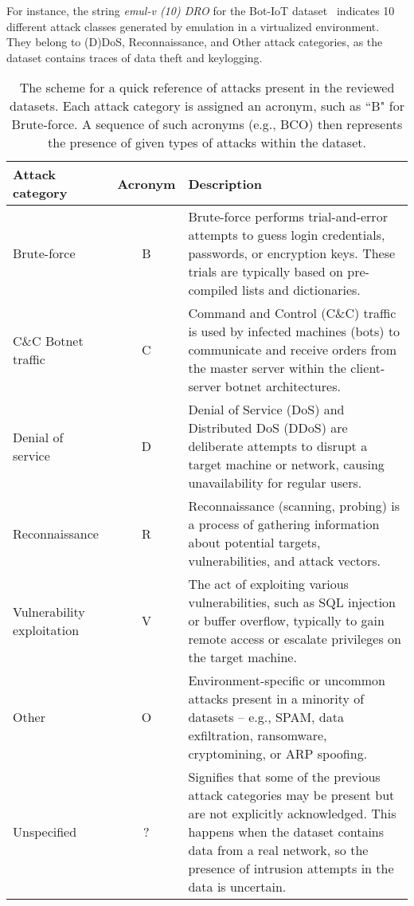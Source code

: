For instance, the string \emph{emul-v (10) DRO} for the Bot-IoT dataset~\cite{koroniotis2019_botiot_dataset} indicates 10 different attack classes generated by emulation in a virtualized environment. They belong to (D)DoS, Reconnaissance, and Other attack categories, as the dataset contains traces of data theft and keylogging.

\begin{table*}[t]
    \centering
    \caption{The scheme for a quick reference of attacks present in the reviewed datasets. Each attack category is assigned an acronym, such as ``B" for Brute-force. A sequence of such acronyms (e.g., BCO) then represents the presence of given types of attacks within the dataset.}
    \vspace*{0.4em}
    \begin{tabular}{p{2.8cm} c p{12.2cm}}
    \textbf{Attack category} & \textbf{Acronym} & \textbf{Description} \\ \toprule
    Brute-force & B & Brute-force performs trial-and-error attempts to guess login credentials, passwords, or encryption keys. These trials are typically based on pre-compiled lists and dictionaries. \\ \midrule
    
    C\&C Botnet traffic & C & Command and Control (C\&C) traffic is used by infected machines (bots) to communicate and receive orders from the master server within the client-server botnet architectures. \\ \midrule

    Denial of service & D & Denial of Service (DoS) and Distributed DoS (DDoS) are deliberate attempts to disrupt a target machine or network, causing unavailability for regular users. \\ \midrule

    Reconnaissance & R & Reconnaissance (scanning, probing) is a process of gathering information about potential targets, vulnerabilities, and attack vectors. \\ \midrule

    Vulnerability \mbox{exploitation} & V & The act of exploiting various vulnerabilities, such as SQL injection or buffer overflow, typically to gain remote access or escalate privileges on the target machine. \\ \midrule

    Other & O & Environment-specific or uncommon attacks present in a minority of datasets -- e.g., SPAM, data exfiltration, ransomware, cryptomining, or ARP spoofing. \\ \midrule

    Unspecified & ? & Signifies that some of the previous attack categories may be present but are not explicitly acknowledged. This happens when the dataset contains data from a real network, so the presence of intrusion attempts in the data is uncertain. \\ \bottomrule
    \end{tabular}
    \label{tab:att_classification}
\end{table*}

